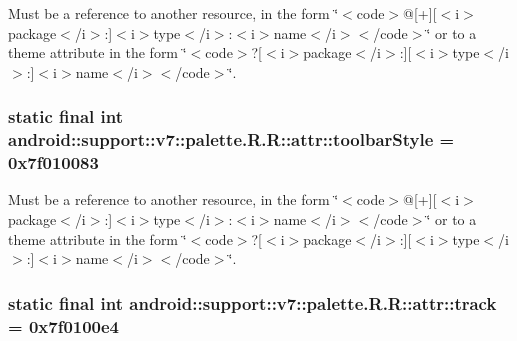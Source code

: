 Must be a reference to another resource, in the form \char`\"{}$<$code$>$@\mbox{[}+\mbox{]}\mbox{[}$<$i$>$package$<$/i$>$:\mbox{]}$<$i$>$type$<$/i$>$:$<$i$>$name$<$/i$>$$<$/code$>$\char`\"{} or to a theme attribute in the form \char`\"{}$<$code$>$?\mbox{[}$<$i$>$package$<$/i$>$:\mbox{]}\mbox{[}$<$i$>$type$<$/i$>$:\mbox{]}$<$i$>$name$<$/i$>$$<$/code$>$\char`\"{}. \hypertarget{classandroid_1_1support_1_1v7_1_1palette_1_1_r_1_1attr_78bab4cf6dd4488f8fa63929f606d912}{
\subsubsection[{toolbarStyle}]{\setlength{\rightskip}{0pt plus 5cm}static final int android::support::v7::palette.R.R::attr::toolbarStyle = 0x7f010083}}
\label{classandroid_1_1support_1_1v7_1_1palette_1_1_r_1_1attr_78bab4cf6dd4488f8fa63929f606d912}


Must be a reference to another resource, in the form \char`\"{}$<$code$>$@\mbox{[}+\mbox{]}\mbox{[}$<$i$>$package$<$/i$>$:\mbox{]}$<$i$>$type$<$/i$>$:$<$i$>$name$<$/i$>$$<$/code$>$\char`\"{} or to a theme attribute in the form \char`\"{}$<$code$>$?\mbox{[}$<$i$>$package$<$/i$>$:\mbox{]}\mbox{[}$<$i$>$type$<$/i$>$:\mbox{]}$<$i$>$name$<$/i$>$$<$/code$>$\char`\"{}. \hypertarget{classandroid_1_1support_1_1v7_1_1palette_1_1_r_1_1attr_578ee0a7b857d3e21d27003d6b2001cf}{
\subsubsection[{track}]{\setlength{\rightskip}{0pt plus 5cm}static final int android::support::v7::palette.R.R::attr::track = 0x7f0100e4}}
\label{classandroid_1_1support_1_1v7_1_1palette_1_1_r_1_1attr_578ee0a7b857d3e21d27003d6b2001cf}


